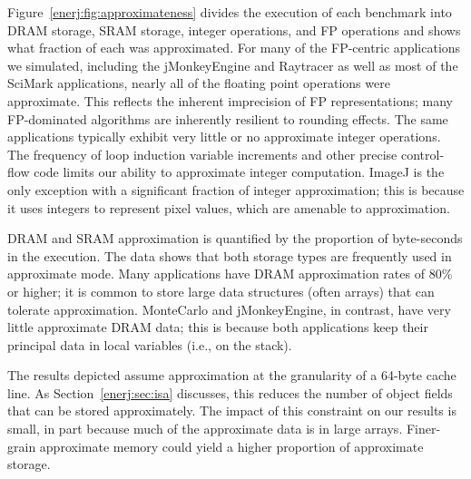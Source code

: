Figure~\ref{enerj:fig:approximateness} divides the execution of each
benchmark into DRAM storage, SRAM storage, integer operations, and FP
operations and shows what fraction of each was approximated. For
many of the FP-centric applications we simulated, including the
jMonkeyEngine and Raytracer as well as most of the SciMark
applications, nearly all of the floating point operations were
approximate. This reflects the inherent imprecision of FP
representations; many FP-dominated algorithms are inherently resilient
to rounding effects.
The same applications typically exhibit very little or no
approximate integer operations. The frequency of loop induction
variable increments and other precise control-flow code limits our
ability to approximate integer computation. ImageJ is the only
exception with a significant fraction of integer approximation; this is
because it uses integers to represent pixel values, which are amenable
to approximation.

DRAM and SRAM approximation is quantified by the proportion of byte-seconds in
the execution.
The data shows that
both storage types are frequently used in approximate
mode. Many applications have DRAM approximation rates
of 80\% or higher; it is common to store large data
structures (often arrays) that can tolerate approximation. MonteCarlo and
jMonkeyEngine, in contrast, have very little approximate DRAM data;
this is because both applications keep their principal data in local
variables (i.e., on the stack).

The results depicted assume approximation at the granularity of a
64-byte cache line. As Section~\ref{enerj:sec:isa} discusses, this
reduces the number of object fields that can be stored
approximately. The impact of this constraint on our
results is small, in part because much of the approximate data is
in large arrays. Finer-grain approximate memory could yield a
higher proportion of approximate storage.




